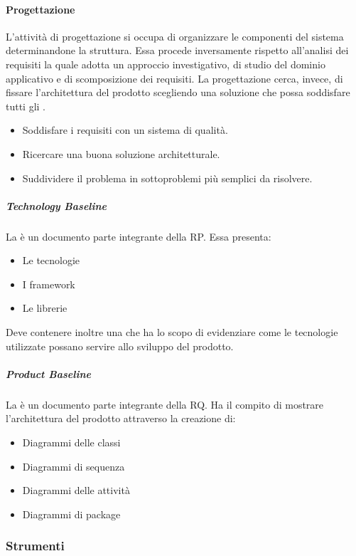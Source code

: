 \documentclass[../norme-di-progetto.tex]{subfiles}
\begin{document}
\paragraph{Progettazione}%
\label{par:progettazione}
L'attività di progettazione si occupa di organizzare le componenti del sistema determinandone la struttura. Essa procede inversamente rispetto all'analisi dei requisiti la quale adotta un approccio investigativo, di studio del dominio applicativo e di scomposizione dei requisiti. La progettazione cerca, invece, di fissare l'architettura del prodotto scegliendo una soluzione che possa soddisfare tutti gli .
\begin{itemize}
  \item Soddisfare i requisiti con un sistema di qualità.
  \item Ricercare una buona soluzione architetturale.
  \item Suddividere il problema in sottoproblemi più semplici da risolvere.
\end{itemize}

\subparagraph{Technology Baseline}%
\label{subp:technology baseline}
La  è un documento parte integrante della RP. Essa presenta:
\begin{itemize}
  \item Le tecnologie
  \item I framework
  \item Le librerie
\end{itemize}
Deve contenere inoltre una  che ha lo scopo di evidenziare come le tecnologie utilizzate possano servire allo sviluppo del prodotto.

\subparagraph{Product Baseline}%
\label{subp:product baseline}
La  è un documento parte integrante della RQ. Ha il compito di mostrare l'architettura del prodotto attraverso la creazione di:
\begin{itemize}
  \item Diagrammi delle classi
  \item Diagrammi di sequenza
  \item Diagrammi delle attività
  \item Diagrammi di package
\end{itemize}

\subsubsection{Strumenti}%
\label{subs:strumenti}
\end{document}
